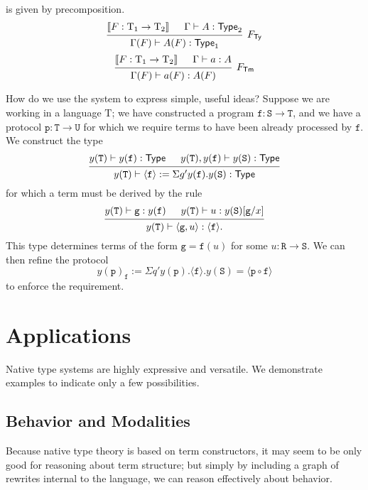 \documentclass[conference]{IEEEtran}
\theoremstyle{definition}
\newcommand{\define}[1]{{\bf \boldmath{#1}}}
\newcommand{\msf}[1]{\mathsf{#1}}
\newcommand{\mrm}[1]{\mathrm{#1}}
\newcommand{\mtt}[1]{\mathtt{#1}}
\newcommand{\T}{\mrm{T}}
\newcommand{\Type}{\msf{Type}}
\newcommand{\tts}{\mtt{S}}
\newcommand{\ttt}{\mtt{T}}
\newcommand{\ttu}{\mtt{U}}
\newcommand{\ttf}{\mtt{f}}
\newcommand{\ttg}{\mtt{g}}
\newcommand{\interp}[1]{\llbracket #1 \rrbracket}
\newcommand{\p}{\mtt{p}}
\begin{document}
\define{Translation} is given by precomposition.
\[\begin{prooftree}
    \hypo{\interp{F:\T_1\to \T_2}}
    \hypo{\Gamma\vdash A:\Type_2}
    \infer2[$F_\msf{Ty}$]{\Gamma(F)\vdash A(F):\Type_1}
\end{prooftree}\]
\[\begin{prooftree}
    \hypo{\interp{F:\T_1\to \T_2}}
    \hypo{\Gamma\vdash a:A}
    \infer2[$F_\msf{Tm}$]{\Gamma(F)\vdash a(F):A(F)}
\end{prooftree}\]

How do we use the system to express simple, useful ideas? Suppose we are working in a language $\T$; we have constructed a program $\ttf:\tts\to \ttt$, and we have a protocol $\mtt{p}:\ttt\to \ttu$ for which we require terms to have been already processed by $\ttf$. We construct the type
\[\begin{prooftree}
    \hypo{y(\ttt)\vdash y(\ttf):\Type}
    \hypo{y(\ttt),y(\ttf)\vdash y(\tts):\Type}
    \infer2[]{y(\ttt)\vdash \langle \ttf\rangle:= \Sigma g'y(\ttf).y(\tts):\Type}
\end{prooftree}\]
for which a term must be derived by the rule
\[\begin{prooftree}
    \hypo{y(\ttt)\vdash \ttg:y(\ttf)}
    \hypo{y(\ttt)\vdash u:y(\tts)[\ttg/x]}
    \infer2[]{y(\ttt)\vdash \langle \ttg,u\rangle:\langle \ttf\rangle.}
\end{prooftree}\]
This type determines terms of the form $\ttg=\ttf(u)$ for some $u:\mtt{R}\to \tts$. We can then refine the protocol
\[y(\p)_\ttf:=\Sigma q'y(\p).\langle \ttf\rangle.y(\tts) = \langle\p\circ \ttf\rangle\] 
to enforce the requirement.



\section{Applications}
\label{sec:apply}

Native type systems are highly expressive and versatile.  We demonstrate examples to indicate only a few possibilities.

\subsection{Behavior and Modalities}
\label{ssec:behavior}

Because native type theory is based on term constructors, it may seem to be only good for reasoning about term structure; but simply by including a graph of rewrites internal to the language, we can reason effectively about behavior.
\end{document}
